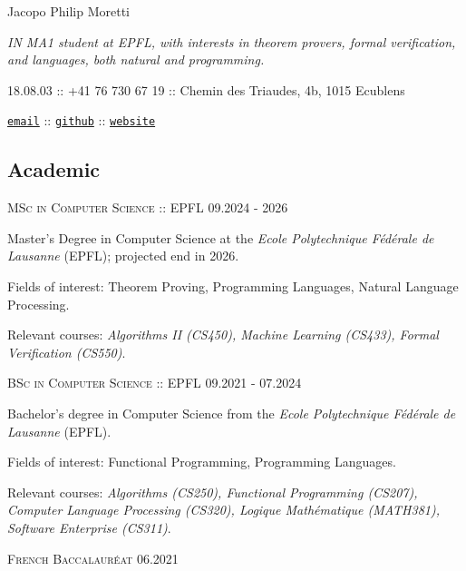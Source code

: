 \documentclass[10pt]{article}
\renewcommand{\url}[1]{{\texttt{#1}}}
\renewcommand{\line}[2]{{\vspace{4pt} \large \noindent\textsc{#1} \hfill \small{#2}}\vspace{4pt}}
\begin{document}
  \setlength{\parindent}{0em}


  \begin{center}
    \begin{minipage}[C]{0.66\textwidth}
      \begin{center}
        \huge Jacopo Philip Moretti
      \end{center}
      \textit{IN MA1 student at EPFL, with interests in theorem provers, formal verification, and languages, both natural and programming.}

      18.08.03 :: +41 76 730 67 19 :: Chemin des Triaudes, 4b, 1015 Ecublens
      \vspace{-0.75em}
      \begin{center}
        \href{https://people.epfl.ch/jacopo.moretti}{\url{email}} :: \href{https://github.com/quartztz}{\url{github}} :: \href{https://quartztz.github.io}{\url{website}}
      \end{center}
    \end{minipage}
  \end{center}

  \subsection*{Academic}

  \line{MSc in Computer Science :: EPFL}{09.2024 - 2026}

  Master's Degree in Computer Science at the \textit{Ecole Polytechnique Fédérale de Lausanne} (EPFL); projected end in 2026.

  Fields of interest: Theorem Proving, Programming Languages, Natural Language Processing.

  Relevant courses: \textit{Algorithms II (CS450), Machine Learning (CS433), Formal Verification (CS550)}.
  \vspace{0.5em}

  \line{BSc in Computer Science :: EPFL}{09.2021 - 07.2024}

  Bachelor's degree in Computer Science from the \textit{Ecole Polytechnique Fédérale de Lausanne} (EPFL).

  Fields of interest: Functional Programming, Programming Languages.

  Relevant courses: \textit{Algorithms (CS250), Functional Programming (CS207), Computer Language Processing (CS320), Logique Mathématique (MATH381), Software Enterprise (CS311)}.
  \vspace{0.5em}

  \line{French Baccalauréat}{06.2021}
\end{document}
